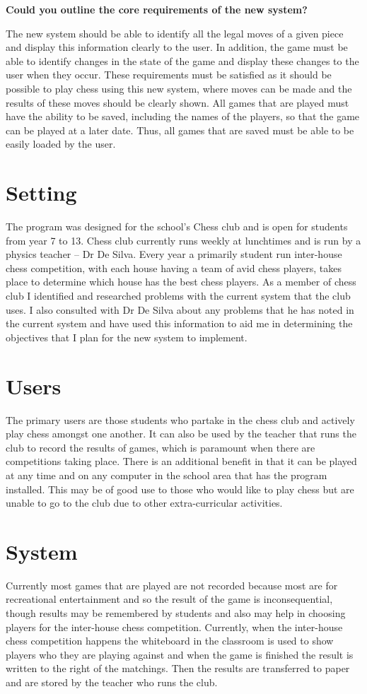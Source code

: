 \textbf{Could you outline the core requirements of the new system?}

The new system should be able to identify all the legal moves of a given piece and display this information clearly to the user. In addition, the game must be able to identify changes in the state of the game and display these changes to the user when they occur. These requirements must be satisfied as it should be possible to play chess using this new system, where moves can be made and the results of these moves should be clearly shown. All games that are played must have the ability to be saved, including the names of the players, so that the game can be played at a later date. Thus, all games that are saved must be able to be easily loaded by the user.
\section{Setting}
The program was designed for the school's Chess club and is open for students from year 7 to 13. Chess club currently runs weekly at lunchtimes and is run by a physics teacher – Dr De Silva. Every year a primarily student run inter-house chess competition, with each house having a team of avid chess players, takes place to determine which house has the best chess players. As a member of chess club I identified and researched problems with the current system that the club uses. I also consulted with Dr De Silva about any problems that he has noted in the current system and have used this information to aid me in determining the objectives that I plan for the new system to implement.
\section{Users}
The primary users are those students who partake in the chess club and actively play chess amongst one another. It can also be used by the teacher that runs the club to record the results of games, which is paramount when there are competitions taking place. There is an additional benefit in that it can be played at any time and on any computer in the school area that has the program installed. This may be of good use to those who would like to play chess but are unable to go to the club due to other extra-curricular activities.
\section{System}
Currently most games that are played are not recorded because most are for recreational entertainment and so the result of the game is inconsequential, though results may be remembered by students and also may help in choosing players for the inter-house chess competition. Currently, when the inter-house chess competition happens the whiteboard in the classroom is used to show players who they are playing against and when the game is finished the result is written to the right of the matchings. Then the results are transferred to paper and are stored by the teacher who runs the club.
